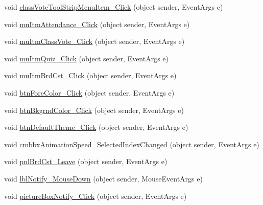 \begin{DoxyCompactItemize}
\item 
void \hyperlink{class_sr_p___classroom_inq_1_1frm_classrrom_inq_ac11a0a3ff559ed2ade5c661899ff300a}{class\-Vote\-Tool\-Strip\-Menu\-Item\-\_\-\-Click} (object sender, \-Event\-Args e)
\item 
void \hyperlink{class_sr_p___classroom_inq_1_1frm_classrrom_inq_a0901d9ca016f018ca62acc5dc4864171}{mu\-Itm\-Attendance\-\_\-\-Click} (object sender, \-Event\-Args e)
\item 
void \hyperlink{class_sr_p___classroom_inq_1_1frm_classrrom_inq_aefa97cd598657ba7e2f095570db36a28}{mu\-Itm\-Class\-Vote\-\_\-\-Click} (object sender, \-Event\-Args e)
\item 
void \hyperlink{class_sr_p___classroom_inq_1_1frm_classrrom_inq_ac5f95d502012ae69fb0b94d64709dbcc}{mu\-Itm\-Quiz\-\_\-\-Click} (object sender, \-Event\-Args e)
\item 
void \hyperlink{class_sr_p___classroom_inq_1_1frm_classrrom_inq_ae97f71a555c40b1051056bf469ae34e7}{mu\-Itm\-Brd\-Cst\-\_\-\-Click} (object sender, \-Event\-Args e)
\item 
void \hyperlink{class_sr_p___classroom_inq_1_1frm_classrrom_inq_a52b78a0b5e0c3ec96fd0bea61c4d7d41}{btn\-Fore\-Color\-\_\-\-Click} (object sender, \-Event\-Args e)
\item 
void \hyperlink{class_sr_p___classroom_inq_1_1frm_classrrom_inq_a8b831d65094ba0fb57078609dec70be6}{btn\-Bkgrnd\-Color\-\_\-\-Click} (object sender, \-Event\-Args e)
\item 
void \hyperlink{class_sr_p___classroom_inq_1_1frm_classrrom_inq_a172ef16a523557b1225d32524bce6776}{btn\-Default\-Theme\-\_\-\-Click} (object sender, \-Event\-Args e)
\item 
void \hyperlink{class_sr_p___classroom_inq_1_1frm_classrrom_inq_a0a93893a224bd683a08e78c13bd44802}{cmbbx\-Animation\-Speed\-\_\-\-Selected\-Index\-Changed} (object sender, \-Event\-Args e)
\item 
void \hyperlink{class_sr_p___classroom_inq_1_1frm_classrrom_inq_a999a3138a18a94d736d0d9460a5d6f2a}{pnl\-Brd\-Cst\-\_\-\-Leave} (object sender, \-Event\-Args e)
\item 
void \hyperlink{class_sr_p___classroom_inq_1_1frm_classrrom_inq_a44187a1b3f84dba71b1e726ef6468cd1}{lbl\-Notify\-\_\-\-Mouse\-Down} (object sender, \-Mouse\-Event\-Args e)
\item 
void \hyperlink{class_sr_p___classroom_inq_1_1frm_classrrom_inq_acd9ffc2f20b9248f26b20a85b4ad947f}{picture\-Box\-Notify\-\_\-\-Click} (object sender, \-Event\-Args e)
\item 

\end{DoxyCompactItemize}
